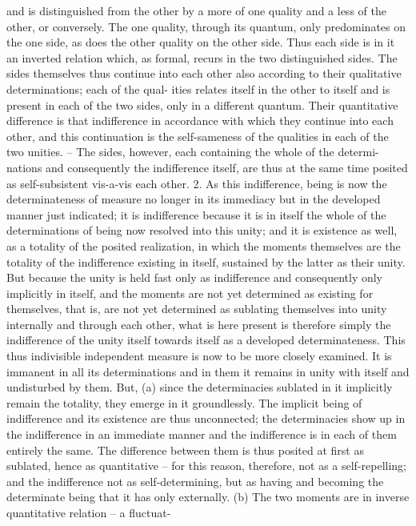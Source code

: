 and is distinguished from the other by a more of one quality and a less
of the other, or conversely. The one quality, through its quantum, only
predominates on the one side, as does the other quality on the other side.
Thus each side is in it an inverted relation which, as formal, recurs in
the two distinguished sides. The sides themselves thus continue into each
other also according to their qualitative determinations; each of the qual-
ities relates itself in the other to itself and is present in each of the two
sides, only in a different quantum. Their quantitative difference is that
indifference in accordance with which they continue into each other, and
this continuation is the self-sameness of the qualities in each of the two
unities. – The sides, however, each containing the whole of the determi-
nations and consequently the indifference itself, are thus at the same time
posited as self-subsistent vis-a-vis each other.
2. As this indifference, being is now the determinateness of measure no
longer in its immediacy but in the developed manner just indicated; it is
indifference because it is in itself the whole of the determinations of being
now resolved into this unity; and it is existence as well, as a totality of the
posited realization, in which the moments themselves are the totality of
the indifference existing in itself, sustained by the latter as their unity. But
because the unity is held fast only as indifference and consequently only
implicitly in itself, and the moments are not yet determined as existing for
themselves, that is, are not yet determined as sublating themselves into unity
internally and through each other, what is here present is therefore simply the
indifference of the unity itself towards itself as a developed determinateness.
This thus indivisible independent measure is now to be more closely
examined. It is immanent in all its determinations and in them it remains in
unity with itself and undisturbed by them. But, (a) since the determinacies
sublated in it implicitly remain the totality, they emerge in it groundlessly.
The implicit being of indifference and its existence are thus unconnected;
the determinacies show up in the indifference in an immediate manner
and the indifference is in each of them entirely the same. The difference
between them is thus posited at first as sublated, hence as quantitative –
for this reason, therefore, not as a self-repelling; and the indifference not as
self-determining, but as having and becoming the determinate being that
it has only externally.
(b) The two moments are in inverse quantitative relation – a fluctuat-
